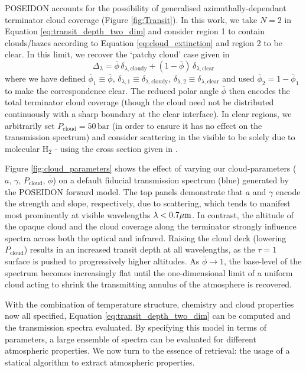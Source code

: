 \documentclass[fleqn,usenatbib]{mnras}
\begin{document}
POSEIDON accounts for the possibility of generalised azimuthally-dependant terminator cloud coverage (Figure \ref{fig:Transit}). In this work, we take $N=2$ in Equation \ref{eq:transit_depth_two_dim} and consider region 1 to contain clouds/hazes according to Equation \ref{eq:cloud_extinction} and region 2 to be clear. In this limit, we recover the `patchy cloud' case given in \citet{Line2016a}
%
\begin{equation}
\Delta_{\lambda} = \bar{\phi} \, \delta_{\lambda, \mathrm{cloudy}} + (1 - \bar{\phi}) \, \delta_{\lambda, \mathrm{clear}}
	\label{eq:transit_depth_patchy}
\end{equation}
%
where we have defined $\bar{\phi}_1 \equiv \bar{\phi}$, $\delta_{\lambda, 1} \equiv \delta_{\lambda, \mathrm{cloudy}}$, $\delta_{\lambda, 2} \equiv \delta_{\lambda, \mathrm{clear}}$ and used $\bar{\phi}_2 =  1 - \bar{\phi}_1$ to make the correspondence clear. The reduced polar angle $\bar{\phi}$ then encodes the total terminator cloud coverage (though the cloud need not be distributed continuously with a sharp boundary at the clear interface). In clear regions, we arbitrarily set $P_{\mathrm{cloud}} = 50 \, \mathrm{bar}$ (in order to ensure it has no effect on the transmission spectrum) and consider scattering in the visible to be solely due to molecular $\mathrm{H}_2$ - using the cross section given in \citet{Dalgarno1962}.

Figure \ref{fig:cloud_parameters} shows the effect of varying our cloud-parameters ($a, \, \gamma, \, P_{\mathrm{cloud}}, \, \bar{\phi}$) on a default fiducial transmission spectrum (blue) generated by the POSEIDON forward model. The top panels demonstrate that $a$ and $\gamma$ encode the strength and slope, respectively, due to scattering, which tends to manifest most prominently at visible wavelengths $\lambda < 0.7 \hbox{$\mu$m}$. In contrast, the altitude of the opaque cloud and the cloud coverage along the terminator strongly influence spectra across both the optical and infrared. Raising the cloud deck (lowering $P_{\mathrm{cloud}}$) results in an increased transit depth at all wavelengths, as the $\tau=1$ surface is pushed to progressively higher altitudes. As $\bar{\phi} \rightarrow 1$, the base-level of the spectrum becomes increasingly flat until the one-dimensional limit of a uniform cloud acting to shrink the transmitting annulus of the atmosphere is recovered.

With the combination of temperature structure, chemistry and cloud properties now all specified, Equation \ref{eq:transit_depth_two_dim} can be computed and the transmission spectra evaluated. By specifying this model in terms of parameters, a large ensemble of spectra can be evaluated for different atmospheric properties. We now turn to the essence of retrieval: the usage of a statical algorithm to extract atmospheric properties.
\end{document}
